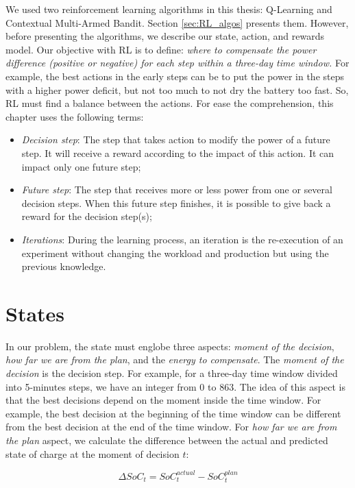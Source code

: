 We used two reinforcement learning algorithms in this thesis: Q-Learning and Contextual Multi-Armed Bandit. Section \ref{sec:RL_algos} presents them. However, before presenting the algorithms, we describe our state, action, and rewards model. Our objective with RL is to define: \textit{where to compensate the power difference (positive or negative) for each step within a three-day time window.} For example, the best actions in the early steps can be to put the power in the steps with a higher power deficit, but not too much to not dry the battery too fast. So, RL must find a balance between the actions. For ease the comprehension, this chapter uses the following terms:
\begin{itemize}
    \item \textit{Decision step}: The step that takes action to modify the power of a future step. It will receive a reward according to the impact of this action. It can impact only one future step;
    \item \textit{Future step}: The step that receives more or less power from one or several decision steps. When this future step finishes, it is possible to give back a reward for the decision step(s);
    \item \textit{Iterations}: During the learning process, an iteration is the re-execution of an experiment without changing the workload and production but using the previous knowledge.
\end{itemize}

\section{States}

In our problem, the state must englobe three aspects: \textit{moment of the decision}, \textit{how far we are from the plan}, and the \textit{energy to compensate}. The \textit{moment of the decision} is the decision step. For example, for a three-day time window divided into 5-minutes steps, we have an integer from 0 to 863. The idea of this aspect is that the best decisions depend on the moment inside the time window. For example, the best decision at the beginning of the time window can be different from the best decision at the end of the time window. For \textit{how far we are from the plan} aspect, we calculate the difference between the actual and predicted state of charge at the moment of decision $t$:

\begin{equation}
    \label{equ:delta_SOC}
    \Delta SoC_t = SoC^{actual}_{t} - SoC^{plan}_{t}
\end{equation}

